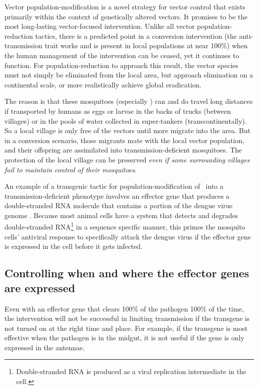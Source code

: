 Vector \gls{population-modification} is a novel strategy for vector control that exists primarily within the context of genetically altered vectors.
It promises to be the most long-lasting vector-focused intervention.
Unlike all vector \gls{population-reduction} tactics, there is a predicted point in a conversion intervention (the anti-transmission trait works and is present in local populations at near 100\%) when the human management of the intervention can be ceased, yet it continues to function.
For \gls{population-reduction} to approach this result, the vector species must not simply be eliminated from the local area, but approach elimination on a continental scale, or more realistically achieve global eradication.

The reason is that these mosquitoes (especially \Aa) can and do travel long distances if transported by humans as eggs or larvae in the backs of trucks (between villages) or in the pools of water collected in super-tankers (transcontinentally).
So a local village is only free of the vectors until more migrate into the area.
But in a conversion scenario, those migrants mate with the local vector population, and their offspring are assimilated into transmission-deficient mosquitoes.
The protection of the local village can be preserved \emph{even if some surrounding villages fail to maintain control of their mosquitoes}.

An example of a transgenic tactic for \gls{population-modification} of \Aa\ into a transmission-deficient phenotype involves an effector gene that produces a double-stranded RNA molecule that contains a portion of the dengue virus genome \cite{Franz2006,Mathur2010}.
Because most animal cells have a system that detects and degrades double-stranded RNA\footnote{Double-stranded RNA is produced as a viral replication intermediate in the cell.}
in a sequence specific manner, this primes the mosquito cells' antiviral response to specifically attack the dengue virus if the effector gene is expressed in the cell before it gets infected.

\subsection{Controlling when and where the effector genes are expressed}

Even with an effector gene that clears 100\% of the pathogen 100\% of the time, the intervention will not be successful in limiting transmission if the transgene is not turned on at the right time and place.
For example, if the transgene is most effective when the pathogen is in the midgut, it is not useful if the gene is only expressed in the antennae.

